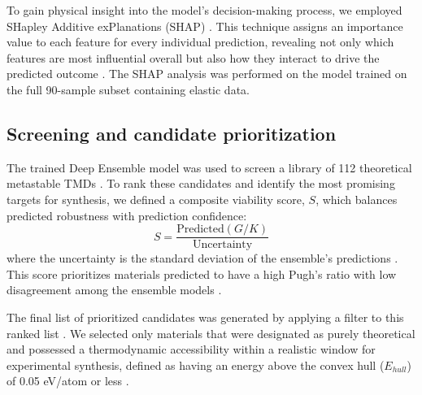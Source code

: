 \documentclass[]{article}
\begin{document}
To gain physical insight into the model's decision-making process, we employed SHapley Additive exPlanations (SHAP) \citep{aas2020explainingindividualpredictionsfeatures,redelmeier2020explainingpredictivemodelsmixed,heskes2020causalshapleyvaluesexploiting,campbell2021exactshapleyvalueslocal,Nohara_2022,olsen2023precisionindividualshapleyvalue,Zhao_2024,whitehouse2026statisticalinferencelearningshapley,lin2026comparativeanalysismachinelearning}. This technique assigns an importance value to each feature for every individual prediction, revealing not only which features are most influential overall but also how they interact to drive the predicted outcome \citep{aas2020explainingindividualpredictionsfeatures,heskes2020causalshapleyvaluesexploiting,campbell2021exactshapleyvalueslocal,Nohara_2022,olsen2023precisionindividualshapleyvalue,Zhao_2024,whitehouse2026statisticalinferencelearningshapley}. The SHAP analysis was performed on the model trained on the full 90-sample subset containing elastic data.

\subsection{Screening and candidate prioritization}
The trained Deep Ensemble model was used to screen a library of 112 theoretical metastable TMDs \citep{liu2024high,samanta2022rapidscreeninghighthroughputground}. To rank these candidates and identify the most promising targets for synthesis, we defined a composite viability score, $S$, which balances predicted robustness with prediction confidence: \citep{xin2025bridgingtheoryexperimentmaterials,Lee_2024,Zhang_2026,jang2021structurebased,song2025accurate,Niyongabo_Rubungo_2025}
\begin{equation}
S = \frac{\text{Predicted}(G/K)}{\text{Uncertainty}}
\end{equation}
where the uncertainty is the standard deviation of the ensemble's predictions \citep{Dutschmann_2023}. This score prioritizes materials predicted to have a high Pugh's ratio with low disagreement among the ensemble models \citep{tran2020methodscomparinguncertaintyquantifications}.

The final list of prioritized candidates was generated by applying a filter to this ranked list \citep{Das_2025}. We selected only materials that were designated as purely theoretical and possessed a thermodynamic accessibility within a realistic window for experimental synthesis, defined as having an energy above the convex hull ($E_{hull}$) of 0.05 eV/atom or less \citep{Anelli_2018,prein2025synthesizabilityguidedpipelinematerialsdiscovery,schlesinger2026thermodynamicassessmentmachinelearning,McDermott_2023}.
\end{document}

